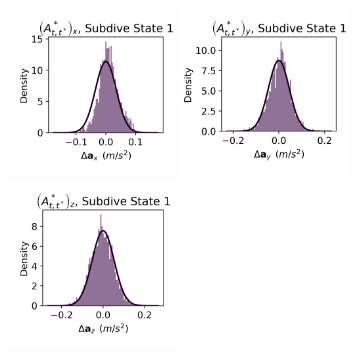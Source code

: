 \documentclass{article}
\begin{document}
        \begin{center}
        \includegraphics[width=1.75in]{../Plots/CarHHMM2_empirical_hist_Ax_0.png}
        \includegraphics[width=1.75in]{../Plots/CarHHMM2_empirical_hist_Ay_0.png}
        \includegraphics[width=1.75in]{../Plots/CarHHMM2_empirical_hist_Az_0.png}
        

\end{center}
\end{document}
